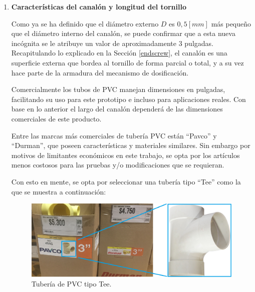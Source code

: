 \begin{enumerate}[(1)]
    \item \textbf{Características del canalón y longitud del tornillo}
    
    Como ya se ha definido que el diámetro externo $D$ es $0,5 [mm]$ más pequeño que el diámetro interno del canalón, se puede confirmar que a esta nueva incógnita se le atribuye un valor de aproximadamente 3 pulgadas. Recapitulando lo explicado en la Sección \ref{endscrew}, el canalón es una superficie externa que bordea al tornillo de forma parcial o total, y a su vez hace parte de la armadura del mecanismo de dosificación.
    
    Comercialmente los tubos de PVC manejan dimensiones en pulgadas, facilitando su uso para este prototipo e incluso para aplicaciones reales. Con base en lo anterior el largo del canalón dependerá de las dimensiones comerciales de este producto.
    
    Entre las marcas más comerciales de tubería PVC están ``Pavco'' y ``Durman'', que poseen características y materiales similares. Sin embargo por motivos de limitantes económicos en este trabajo, se opta por los artículos menos costosos para las pruebas y/o modificaciones que se requieran.
    
	 
	 Con esto en mente, se opta por seleccionar una tubería tipo ``Tee'' como la que se muestra a continuación:
	 
	\begin{figure}[H]
	    \begin{center}
	    	\includegraphics[scale=0.60]{img/pvct.png}
        \end{center}
	    \caption{Tubería de PVC tipo Tee. \label{pvctpng}}
    \end{figure}
	 

\end{enumerate}
